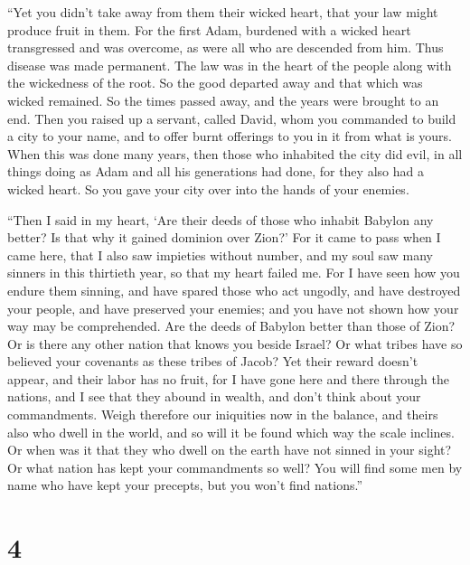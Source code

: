  ``Yet you didn't take away from them their wicked heart,
that your law might produce fruit in them.  For the first
Adam, burdened with a wicked heart transgressed and was overcome, as
were all who are descended from him.  Thus disease was
made permanent. The law was in the heart of the people along with the
wickedness of the root. So the good departed away and that which was
wicked remained.  So the times passed away, and the years
were brought to an end. Then you raised up a servant, called David,
 whom you commanded to build a city to your name, and to
offer burnt offerings to you in it from what is yours. 
When this was done many years, then those who inhabited the city did
evil,  in all things doing as Adam and all his
generations had done, for they also had a wicked heart. 
So you gave your city over into the hands of your enemies.

 ``Then I said in my heart, `Are their deeds of those who
inhabit Babylon any better? Is that why it gained dominion over Zion?'
 For it came to pass when I came here, that I also saw
impieties without number, and my soul saw many sinners in this thirtieth
year, so that my heart failed me.  For I have seen how
you endure them sinning, and have spared those who act ungodly, and have
destroyed your people, and have preserved your enemies; 
and you have not shown how your way may be comprehended. Are the deeds
of Babylon better than those of Zion?  Or is there any
other nation that knows you beside Israel? Or what tribes have so
believed your covenants as these tribes of Jacob?  Yet
their reward doesn't appear, and their labor has no fruit, for I have
gone here and there through the nations, and I see that they abound in
wealth, and don't think about your commandments.  Weigh
therefore our iniquities now in the balance, and theirs also who dwell
in the world, and so will it be found which way the scale inclines.
 Or when was it that they who dwell on the earth have not
sinned in your sight? Or what nation has kept your commandments so well?
 You will find some men by name who have kept your
precepts, but you won't find nations.''

\hypertarget{section-3}{%
\section{4}\label{section-3}}

